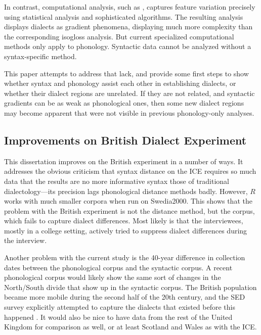 In contrast, computational analysis, such as \cite{shackleton07},
captures feature variation precisely using statistical analysis and
sophisticated algorithms. The resulting analysis displays dialects as
gradient phenomena, displaying much more complexity than the
corresponding isogloss analysis. But current specialized computational
methods only apply to phonology. Syntactic data cannot be analyzed
without a syntax-specific method.

This paper attempts to address that lack, and provide some first steps
to show whether syntax and phonology assist each other in establishing
dialects, or whether their dialect regions are unrelated. If they are not
related, and syntactic gradients can be as weak as phonological ones,
then some new dialect regions may become apparent that were not visible in
previous phonology-only analyses.

\subsection{Improvements on British Dialect Experiment}

This dissertation improves on the British experiment in a number of
ways. It addresses the obvious criticism that syntax distance on the
ICE requires so much data that the results are no more informative
syntax those of traditional dialectology---its precision lags
phonological distance methods badly. However, $R$ works with much
smaller corpora when run on Swedia2000. This shows that the problem
with the British experiment is not the distance method, but the
corpus, which fails to capture dialect differences. Most likely is
that the interviewees, mostly in a college setting, actively tried to
suppress dialect differences during the interview.

Another problem with the current study is the 40-year difference in
collection dates between the phonological corpus and the syntactic
corpus. A recent phonological corpus would likely show the same sort
of changes in the North/South divide that show up in the syntactic
corpus. The British population became more mobile during the second
half of the 20th century, and the SED survey explicitly attempted to capture
the dialects that existed before this happened \cite{orton78}.
It would also be nice to have data from the rest of the United Kingdom for
comparison as well, or at least Scotland and Wales as with the ICE.



